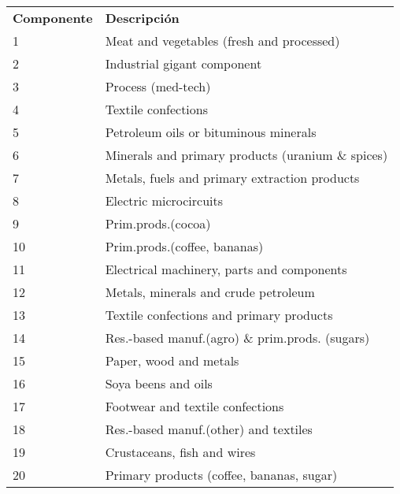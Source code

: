 \documentclass[class=article, crop=false]{standalone}
\begin{document}
\begin{table}[]
	\begin{tabular}{ll}
		\textbf{Componente} & \textbf{Descripción}                                   \\
		1          & Meat and vegetables (fresh and processed)                       \\
		2          & Industrial gigant component                      \\
		3          & Process (med-tech)                                              \\
		4          & Textile confections                                             \\
		5          & Petroleum oils or bituminous minerals                           \\
		6          & Minerals and primary products (uranium \& spices)               \\
		7          & Metals, fuels and primary extraction products                   \\
		8          & Electric microcircuits                                          \\
		9          & Prim.prods.(cocoa)                                              \\
		10         & Prim.prods.(coffee, bananas)                                    \\
		11         & Electrical machinery, parts and components                      \\
		12         & Metals, minerals and crude petroleum                            \\
		13         & Textile confections and primary products                        \\
		14         & Res.-based manuf.(agro) \& prim.prods. (sugars)                 \\
		15         & Paper, wood and metals                                          \\
		16         & Soya beens and oils                                             \\
		17         & Footwear and textile confections                                \\
		18         & Res.-based manuf.(other) and textiles                           \\
		19         & Crustaceans, fish and wires                                     \\
		20         & Primary products (coffee, bananas, sugar)                       \\

\end{tabular}
\end{table}
\end{document}
